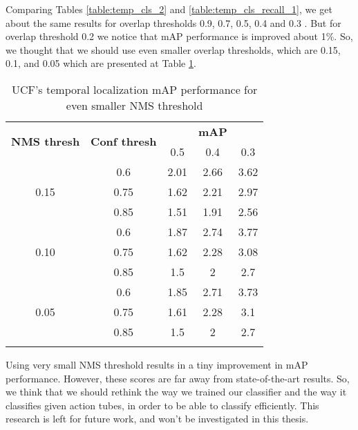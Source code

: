 Comparing Tables \ref{table:temp_cls_2} and \ref{table:temp_cls_recall_1}, we get about the same results for overlap thresholds 0.9, 0.7, 0.5, 0.4 and
0.3 . But for overlap threshold 0.2 we notice that mAP performance is improved about 1\%. So, we thought that we should use even smaller overlap thresholds,
which are 0.15, 0.1, and 0.05 which are presented at Table \ref{table:temp_cls_2_1}.

\begin{center}
  \begin{longtable}{|| c | c | c c c||}
    \hline
    \multirow{2}{*}{\textbf{NMS thresh}} & \multirow{2}{*}{\textbf{Conf thresh}} & {} & \textbf{mAP} & {} \\
    {} & {} & 0.5 & 0.4 & 0.3 \\
    \hline
    \multirow{3}{*}{0.15} & 0.6 & 2.01 & 2.66 & 3.62 \\
    \cline{2-5}
    {} & 0.75 & 1.62 & 2.21 & 2.97 \\
    \cline{2-5}
    {} & 0.85 & 1.51 & 1.91 & 2.56 \\
    \hline
    \multirow{3}{*}{0.10} & 0.6 & 1.87 & 2.74 & 3.77 \\
    \cline{2-5}
    {} & 0.75 & 1.62 & 2.28 & 3.08  \\
    \cline{2-5}
    {} & 0.85 & 1.5 & 2 & 2.7  \\
    \hline
    \multirow{3}{*}{0.05} & 0.6 & 1.85 & 2.71 & 3.73  \\
    \cline{2-5}
    {} & 0.75 & 1.61 & 2.28 & 3.1  \\
    \cline{2-5}
    {} & 0.85 & 1.5 & 2 & 2.7 \\
    \hline

    \caption{UCF's temporal localization mAP performance for even smaller NMS threshold}
    \label{table:temp_cls_2_1}

  \end{longtable}
\end{center}

Using very small NMS threshold results in a tiny improvement in mAP performance. However, these scores are far away from state-of-the-art results. So, we think that
we should rethink the way we trained our classifier and the way it classifies given action tubes, in order to be able to classify efficiently. This research is
left for future work, and won't be investigated in this thesis.

% 
